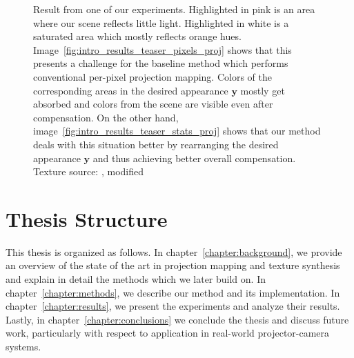 \begin{figure}[ht]
    \caption{Result from one of our experiments. Highlighted in pink is an area where our scene reflects little light. Highlighted in white is a saturated area which mostly reflects orange hues. Image~\ref{fig:intro_results_teaser_pixels_proj} shows that this presents a challenge for the baseline method which performs conventional per-pixel projection mapping. Colors of the corresponding areas in the desired appearance \(\bm{y}\) mostly get absorbed and colors from the scene are visible even after compensation. On the other hand, image~\ref{fig:intro_results_teaser_stats_proj} shows that our method deals with this situation better by rearranging the desired appearance \(\bm{y}\) and thus achieving better overall compensation. Texture source: \citet{Pixar128}, modified}
    \label{fig:intro_result_teaser}
\end{figure}

\section{Thesis Structure}
\label{section:intro-thesis_structure}

This thesis is organized as follows. In chapter~\ref{chapter:background}, we provide an overview of the state of the art in projection mapping and texture synthesis and explain in detail the methods which we later build on. In chapter~\ref{chapter:methods}, we describe our method and its implementation. In chapter~\ref{chapter:results}, we present the experiments and analyze their results. Lastly, in chapter~\ref{chapter:conclusions} we conclude the thesis and discuss future work, particularly with respect to application in real-world projector-camera systems.
